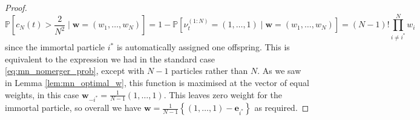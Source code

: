 \documentclass{article}
\newcommand{\PR}{\mathbb{P}}
\begin{document}
\begin{proof}
\begin{equation*}
\PR \left[c_N(t) > \frac{2}{N^2} \mid \mathbf{w}=(w_1, \dots, w_N) \right]
= 1- \PR[\nu_t^{(1:N)} = (1,\dots, 1) \mid \mathbf{w}=(w_1, \dots, w_N)] 
= (N-1)! \prod_{i\neq i^*}^{N} w_i
\end{equation*}
since the immortal particle $i^*$ is automatically assigned one offspring.
This is equivalent to the expression we had in the standard case \eqref{eq:mn_nomerger_prob}, except with $N-1$ particles rather than $N$. 
As we saw in Lemma \ref{lem:mn_optimal_w}, this function is maximised at the vector of equal weights, in this case $\mathbf{w}_{-i^*}=\frac{1}{N-1} (1,\dots,1)$. 
This leaves zero weight for the immortal particle, so overall we have $\mathbf{w}=\frac{1}{N-1} \left\{ (1,\dots,1) - \mathbf{e}_{i^*} \right\}$ as required.
\end{proof}
\end{document}
